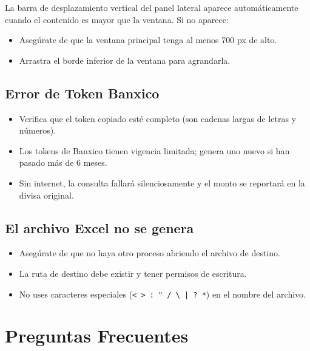 \documentclass[12pt, a4paper, oneside]{report}
\begin{document}
La barra de desplazamiento vertical del panel lateral aparece automáticamente
cuando el contenido es mayor que la ventana. Si no aparece:

\begin{itemize}
  \item Asegúrate de que la ventana principal tenga al menos 700 px de alto.
  \item Arrastra el borde inferior de la ventana para agrandarla.
\end{itemize}

\section{Error de Token Banxico}

\begin{itemize}
  \item Verifica que el token copiado esté completo (son cadenas largas
        de letras y números).
  \item Los tokens de Banxico tienen vigencia limitada; genera uno nuevo si
        han pasado más de 6 meses.
  \item Sin internet, la consulta fallará silenciosamente y el monto se
        reportará en la divisa original.
\end{itemize}

\section{El archivo Excel no se genera}

\begin{itemize}
  \item Asegúrate de que no haya otro proceso abriendo el archivo de destino.
  \item La ruta de destino debe existir y tener permisos de escritura.
  \item No uses caracteres especiales (\texttt{< > : " / \textbackslash{} | ? *})
        en el nombre del archivo.
\end{itemize}

\chapter{Preguntas Frecuentes}
\end{document}
